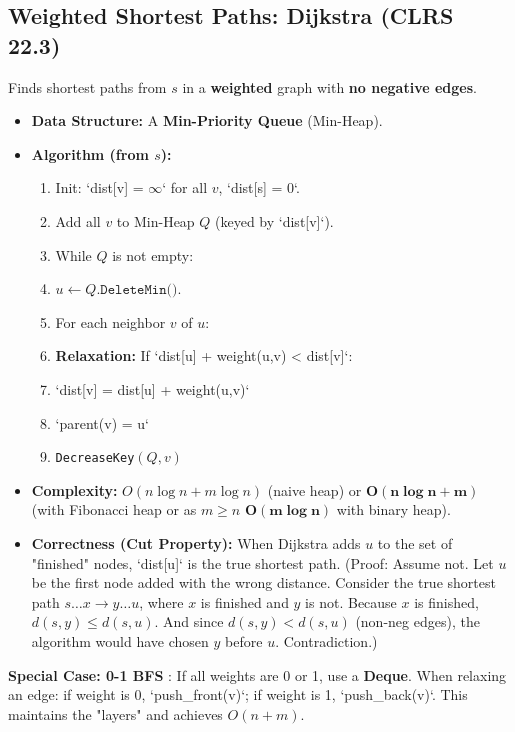 \subsection{Weighted Shortest Paths: Dijkstra (CLRS 22.3)}
Finds shortest paths from $s$ in a \textbf{weighted} graph with \textbf{no negative edges}.
\begin{itemize}
    \item \textbf{Data Structure:} A \textbf{Min-Priority Queue} (Min-Heap).
    \item \textbf{Algorithm (from $s$):}
    \begin{enumerate}
        \item Init: `dist[v] = $\infty$` for all $v$, `dist[s] = 0`.
        \item Add all $v$ to Min-Heap $Q$ (keyed by `dist[v]`).
        \item While $Q$ is not empty:
        \item $u \gets Q.\texttt{DeleteMin()}$.
        \item For each neighbor $v$ of $u$:
        \item \textbf{Relaxation:} If `dist[u] + weight(u,v) < dist[v]`:
        \item `dist[v] = dist[u] + weight(u,v)`
        \item `parent(v) = u`
        \item \texttt{DecreaseKey}$(Q, v)$
    \end{enumerate}
    \item \textbf{Complexity:} $O(n \log n + m \log n)$ (naive heap) or $\mathbf{O(n \log n + m)}$ (with Fibonacci heap or as $m \ge n$ $\mathbf{O(m \log n)}$ with binary heap).
    \item \textbf{Correctness (Cut Property):} When Dijkstra adds $u$ to the set of "finished" nodes, `dist[u]` is the true shortest path. (Proof: Assume not. Let $u$ be the first node added with the wrong distance. Consider the true shortest path $s \dots x \to y \dots u$, where $x$ is finished and $y$ is not. Because $x$ is finished, $d(s,y) \le d(s,u)$. And since $d(s,y) < d(s,u)$ (non-neg edges), the algorithm would have chosen $y$ before $u$. Contradiction.)
\end{itemize}
\textbf{Special Case: 0-1 BFS} : If all weights are 0 or 1, use a \textbf{Deque}. When relaxing an edge: if weight is 0, `push\_front(v)`; if weight is 1, `push\_back(v)`. This maintains the "layers" and achieves $O(n+m)$.

